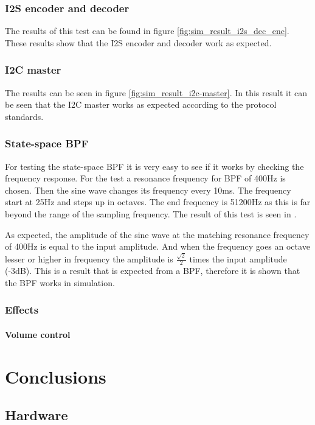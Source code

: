 \subsubsection{I2S encoder and decoder}
The results of this test can be found in figure \ref{fig:sim_result_i2s_dec_enc}. These results show that the I2S encoder and decoder work as expected. 

\subsubsection{I2C master}
The results can be seen in figure \ref{fig:sim_result_i2c-master}. In this result it can be seen that the I2C master works as expected according to the protocol standards.

\subsubsection{State-space BPF}
For testing the state-space BPF it is very easy to see if it works by checking the frequency response. For the test a resonance frequency for BPF of 400Hz is chosen. Then the sine wave changes its frequency every 10ms. The frequency start at 25Hz and steps up in octaves. The end frequency is 51200Hz as this is far beyond the range of the sampling frequency. The result of this test is seen in . 

As expected, the amplitude of the sine wave at the matching resonance frequency of 400Hz is equal to the input amplitude. And when the frequency goes an octave lesser or higher in frequency the amplitude is $\frac{\sqrt{2}}{2}$ times the input amplitude (-3dB). This is a result that is expected from a BPF, therefore it is shown that the BPF works in simulation.

\subsubsection{Effects}
\paragraph{Volume control}


\section{Conclusions}
\subsection{Hardware}

